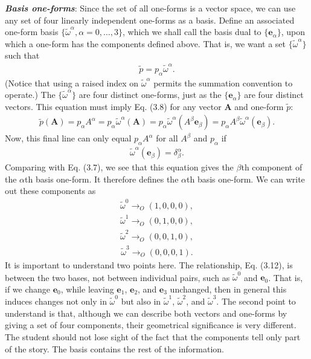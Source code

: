 \documentclass[12pt]{book}
\begin{document}
    \textit{\textbf{Basis one-forms}}: Since the set of all one-forms is a vector space, we can use any set of four linearly independent one-forms as a basis. Define an associated one-form basis \(\{ \tilde{\omega}^\alpha, \alpha = 0, \dots, 3 \}\), which we shall call the basis dual to \(\{\mathbf{e}_\alpha\}\), upon which a one-form has the components defined above. That is, we want a set \(\{\tilde{\omega}^\alpha\}\) such that    \begin{align}
    \tilde{p} = p_\alpha \tilde{\omega}^\alpha. \tag{3.11}
    \end{align}
    (Notice that using a raised index on \(\tilde{\omega}^\alpha\) permits the summation convention to operate.) The \(\{\tilde{\omega}^\alpha\}\) are four distinct one-forms, just as the \(\{\mathbf{e}_\alpha\}\) are four distinct vectors. This equation must imply Eq. (3.8) for any vector \(\mathbf{A}\) and one-form \(\tilde{p}\):
    \begin{align}
    \tilde{p}(\mathbf{A}) = p_\alpha A^\alpha= p_\alpha \tilde{\omega}^\alpha(\mathbf{A})
    = p_\alpha \tilde{\omega}^\alpha(A^\beta \mathbf{e}_\beta)
    = p_\alpha A^\beta \tilde{\omega}^\alpha(\mathbf{e}_\beta).
    \end{align}
    Now, this final line can only equal \(p_\alpha A^\alpha\) for all \(A^\beta\) and \(p_\alpha\) if
    \begin{align}
    \tilde{\omega}^\alpha(\mathbf{e}_\beta) = \delta^\alpha_\beta. \tag{3.12}
    \end{align}
    Comparing with Eq. (3.7), we see that this equation gives the \(\beta\)th component of the \(\alpha\)th basis one-form. It therefore defines the \(\alpha\)th basis one-form. We can write out these components as
    \begin{align}
    \tilde{\omega}^0 \rightarrow_O (1, 0, 0, 0),
    \end{align}
    \begin{align}
    \tilde{\omega}^1 \rightarrow_O (0, 1, 0, 0),
    \end{align}
    \begin{align}
    \tilde{\omega}^2 \rightarrow_O (0, 0, 1, 0),
    \end{align}
    \begin{align}
    \tilde{\omega}^3 \rightarrow_O (0, 0, 0, 1).
    \end{align}
    It is important to understand two points here. The relationship, Eq. (3.12), is between the two bases, not between individual pairs, such as \(\tilde{\omega}^0\) and \(\mathbf{e}_0\). That is, if we change \(\mathbf{e}_0\), while leaving \(\mathbf{e}_1\), \(\mathbf{e}_2\), and \(\mathbf{e}_3\) unchanged, then in general this induces changes not only in \(\tilde{\omega}^0\) but also in \(\tilde{\omega}^1\), \(\tilde{\omega}^2\), and \(\tilde{\omega}^3\). The second point to understand is that, although we can describe both vectors and one-forms by giving a set of four components, their geometrical significance is very different. The student should not lose sight of the fact that the components tell only part of the story. The basis contains the rest of the information.
\end{document}
